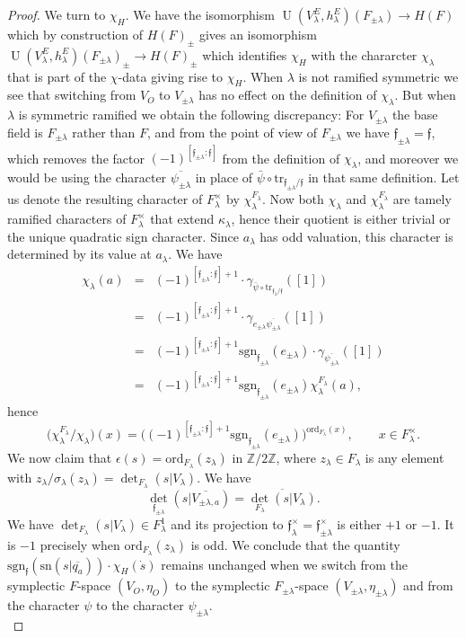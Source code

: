 \documentclass{article}
\def\tx#1{\textrm{#1}}
\def\Z{\mathbb{Z}}
\def\ol#1{\overline{#1}}
\theoremstyle{definition}
\numberwithin{equation}{subsection}
\renewcommand{\-}{\hyp{}}
\DeclareMathOperator{\U}{U}
\newcommand{\rf}{\mathfrak{f}}
\begin{document}
\begin{proof}
	We turn to $\chi_H$. We have the isomorphism $\U(V_\lambda^E,h_\lambda^E)(F_{\pm\lambda}) \to H(F)$ which by construction of $H(F)_\pm$ gives an isomorphism $\U(V_\lambda^E,h_\lambda^E)(F_{\pm\lambda})_\pm \to H(F)_\pm$ which identifies $\chi_H$ with the chararcter $\chi_\lambda$ that is part of the $\chi$-data giving rise to $\chi_H$. When $\lambda$ is not ramified symmetric we see that switching from $V_O$ to $V_{\pm\lambda}$ has no effect on the definition of $\chi_\lambda$. But when $\lambda$ is symmetric ramified we obtain the following discrepancy: For $V_{\pm\lambda}$ the base field is $F_{\pm\lambda}$ rather than $F$, and from the point of view of $F_{\pm\lambda}$ we have $\rf_{\pm\lambda}=\rf$, which removes the factor $(-1)^{[\rf_{\pm\lambda}:\rf]}$ from the definition of $\chi_\lambda$, and moreover we would be using the character $\ol{\psi_{\pm\lambda}}$ in place of $\bar\psi\circ\tx{tr}_{\rf_{\pm\lambda}/\rf}$ in that same definition. Let us denote the resulting character of $F_\lambda^\times$ by $\chi_\lambda^{F_\lambda}$. Now both $\chi_\lambda$ and $\chi_\lambda^{F_\lambda}$ are tamely ramified characters of $F_\lambda^\times$ that extend $\kappa_\lambda$, hence their quotient is either trivial or the unique quadratic sign character. Since $a_\lambda$ has odd valuation, this character is determined by its value at $a_\lambda$. We have 
	\begin{eqnarray*}
		\chi_\lambda(a)&=&(-1)^{[\rf_{\pm\lambda}:\rf]+1}\cdot\gamma_{\bar\psi\circ \tx{tr}_{\rf_\lambda/\rf}}([1])\\
		&=&(-1)^{[\rf_{\pm\lambda}:\rf]+1}\cdot\gamma_{e_{\pm\lambda}\ol{\psi_{\pm\lambda}}}([1])\\
		&=&(-1)^{[\rf_{\pm\lambda}:\rf]+1}\tx{sgn}_{\rf_{\pm\lambda}}(e_{\pm\lambda})\cdot\gamma_{\ol{\psi_{\pm\lambda}}}([1])\\
		&=&(-1)^{[\rf_{\pm\lambda}:\rf]+1}\tx{sgn}_{\rf_{\pm\lambda}}(e_{\pm\lambda})\chi_\lambda^{F_\lambda}(a),
	\end{eqnarray*}
	hence
	\[ \Big(\chi_\lambda^{F_\lambda}/\chi_\lambda\Big)(x) = \Big((-1)^{[\rf_{\pm\lambda}:\rf]+1}\tx{sgn}_{\rf_{\pm\lambda}}(e_{\pm\lambda})\Big)^{\tx{ord}_{F_\lambda}(x)},\qquad x \in F_\lambda^\times. \]
	We now claim that $\epsilon(s)=\tx{ord}_{F_\lambda}(z_\lambda)$ in $\Z/2\Z$, where $z_\lambda \in F_\lambda$ is any element with $z_\lambda/\sigma_\lambda(z_\lambda)=\det_{F_\lambda}(s|V_\lambda)$. We have 
	\[ 
		\det_{\rf_{\pm\lambda}}(s|\ol{V_{\pm\lambda,a}})
		=\ol{\det_{F_\lambda}(s|V_{\lambda})}.
	\]
	We have $\det_{F_\lambda}(s|V_{\lambda}) \in F_\lambda^1$ and its projection to $\rf_\lambda^\times=\rf_{\pm\lambda}^\times$ is either $+1$ or $-1$. It is $-1$ precisely when $\tx{ord}_{F_\lambda}(z_\lambda)$ is odd. We conclude that the quantity $\tx{sgn}_\rf(\tx{sn}(s|\ol{q_a})) \cdot \chi_H(\dot s)$ remains unchanged when we switch from the symplectic $F$-space $(V_O,\eta_O)$ to the symplectic $F_{\pm\lambda}$-space $(V_{\pm\lambda},\eta_{\pm\lambda})$ and from the character $\psi$ to the character $\psi_{\pm\lambda}$.
	\ \\
   


\end{proof}
\end{document}
